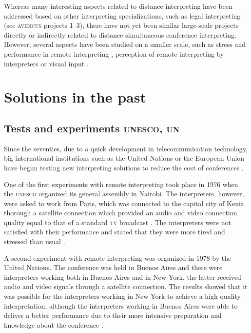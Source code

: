 \documentclass[output=paper]{langsci/langscibook}
\begin{document}
Whereas many interesting aspects related to distance interpreting have been addressed based on other interpreting specializations, such as legal interpreting (see \textsc{avidicus} projects 1--3), there have not yet been similar large-scale projects directly or indirectly related to distance simultaneous conference interpreting. However, several aspects have been studied on a smaller scale, such as stress and performance in remote interpreting \citep{Moser-Mercer2003,Roziner2010}, perception of remote interpreting by interpreters \citep{Mouzourakis2006} or visual input \citep{Rennert2008,Luisetto2016}.

\section{Solutions in the past}
\label{sec:ziegler:03}
\subsection{Tests and experiments \textsc{unesco}, \textsc{un}}
\label{sub:ziegler:3.1}
Since the seventies, due to a quick development in telecommunication technology, big international institutions such as the United Nations or the European Union have begun testing new interpreting solutions to reduce the cost of conferences \citep[26]{UNESCO1987}.

One of the first experiments with remote interpreting took place in 1976 when the \textsc{unesco} organized its general assembly in Nairobi. The interpreters, however, were asked to work from Paris, which was connected to the capital city of Kenia thorough a satellite connection which provided an audio and video connection quality equal to that of a standard \textsc{tv} broadcast \citep[30]{Mouzourakis1996}. The interpreters were not satisfied with their performance and stated that they were more tired and stressed than usual \citep[294]{Kurz2000}.

A second experiment with remote interpreting was organized in 1978 by the United Nations. The conference was held in Buenos Aires and there were interpreters working both in Buenos Aires and in New York, the latter received audio and video signals through a satellite connection. The results showed that it was possible for the interpreters working in New York to achieve a high quality interpretation, \citep[26]{UNESCO1987} although the interpreters working in Buenos Aires were able to deliver a better performance due to their more intensive preparation and knowledge about the conference \citep[82--90]{Chernov2004}. 
\end{document}
